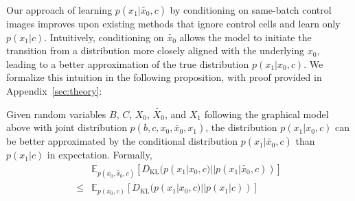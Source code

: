 Our approach of learning $p(x_1|\tilde{x_0},c)$ by conditioning on same-batch control images improves upon existing methods that ignore control cells and learn only $p(x_1|c)$. Intuitively, conditioning on $\tilde{x_0}$ allows the model to initiate the transition from a distribution more closely aligned with the underlying $x_0$, leading to a better approximation of the true distribution $p(x_1|x_0,c)$. We formalize this intuition in the following proposition, with proof provided in Appendix~\ref{sec:theory}:

\begin{prop}
    \label{prop:cond}
    Given random variables $B$, $C$, $X_0$, $\tilde{X_0}$, and $X_1$ following the graphical model above with joint distribution $p(b, c, x_0, \tilde{x_0}, x_1)$, the distribution $p(x_1|x_0,c)$ can be better approximated by the conditional distribution $p(x_1|\tilde{x_0},c)$ than $p(x_1|c)$ in expectation. Formally,
    \begin{equation}
    \begin{split}
    & \mathbb{E}_{p(x_0, \tilde{x_0}, c)}\left[ D_{\text{KL}}(p(x_1|x_0,c)||p(x_1|\tilde{x_0},c)) \right] \nonumber\\
    \leq  & \mathbb{E}_{p(x_0, c)}\left[ D_{\text{KL}}(p(x_1|x_0,c)||p(x_1|c)) \right]
    \end{split}
    \end{equation}
\end{prop}
